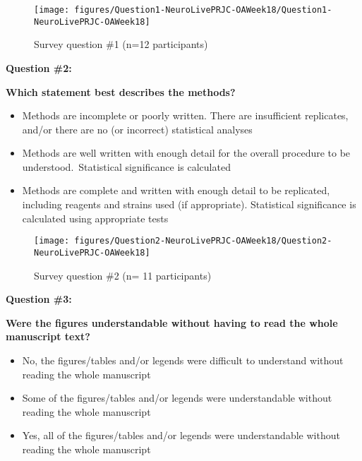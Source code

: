 \documentclass[10pt]{article}
\providecommand{\tightlist}{\setlength{\itemsep}{0pt}\setlength{\parskip}{0pt}}%
\begin{document}
\par\null{}
\begin{figure}[h!]
\begin{center}
\texttt{[image: figures/Question1-NeuroLivePRJC-OAWeek18/Question1-NeuroLivePRJC-OAWeek18]}
\caption{{Survey question \#1 (n=12 participants)
{\label{789006}}%
}}
\end{center}
\end{figure}

\textbf{Question \#2:}

\textbf{Which statement best describes the methods?}

\begin{itemize}
\tightlist
\item
  Methods are incomplete or poorly written. There are insufficient
  replicates, and/or there are no (or incorrect) statistical analyses
\item
  Methods are well written with enough detail for the overall procedure
  to be understood.~Statistical significance is calculated
\item
  Methods are complete and written with enough detail to be replicated,
  including reagents and strains used (if appropriate). Statistical
  significance is calculated using appropriate tests
\end{itemize}

\par\null\par\null\par\null{}
\begin{figure}[h!]
\begin{center}
\texttt{[image: figures/Question2-NeuroLivePRJC-OAWeek18/Question2-NeuroLivePRJC-OAWeek18]}
\caption{{Survey question \#2 (n= 11 participants)
{\label{979776}}%
}}
\end{center}
\end{figure}

\textbf{Question \#3:}

\textbf{Were the figures understandable without having to read the whole
manuscript text?}

\begin{itemize}
\tightlist
\item
  No, the figures/tables and/or legends were difficult to understand
  without reading the whole manuscript
\item
  Some of the figures/tables and/or legends were understandable without
  reading the whole manuscript
\item
  Yes, all of the figures/tables and/or legends were understandable
  without reading the whole manuscript
\end{itemize}
\end{document}
